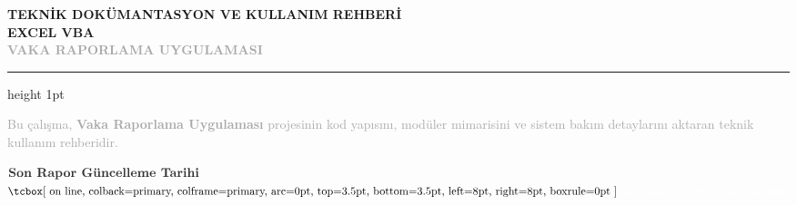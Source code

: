 \documentclass[11pt,a4paper,oneside]{report}
\begin{document}
\shorthandoff{=}

\begin{titlepage}
    \nopagecolor
    
    \vspace*{0.3cm}
    \begin{hfil}
    \begin{minipage}{0.85\textwidth}
        \linespread{1.2}\selectfont
        {\small\bfseries\textcolor{secondary}{TEKNİK DOKÜMANTASYON VE KULLANIM REHBERİ}} \\[0.3cm]
        {\Huge \bfseries \textcolor{primary}{EXCEL VBA}} \\[0.2cm]
        {\huge \bfseries \textcolor{darkgray}{VAKA RAPORLAMA UYGULAMASI}} \\[0.5cm]
        {\color{bordergray}\hrule height 1pt} 
        
        \vspace{2.5cm}
        
        \raggedright
        \small \textcolor{darkgray}{
           Bu çalışma, \textbf{Vaka Raporlama Uygulaması} projesinin kod yapısını, modüler mimarisini ve sistem bakım detaylarını aktaran teknik kullanım rehberidir.
        }
        
        \vspace{0.6cm}
        
        \begin{tcolorbox}[
            colback=lightgray,
            colframe=bordergray,
            leftrule=3.5pt,
            boxrule=0.4pt,
            top=6pt, bottom=6pt, left=10pt, right=10pt
        ]
            \small \centering
            $\vcenter{\hbox{\textcolor{primary}{\textbf{Son Rapor Güncelleme Tarihi}}}}$%
            \hspace{8pt}%
            $\vcenter{\hbox{%
                \tcbox[
                    on line,
                    colback=primary,
                    colframe=primary,
                    arc=0pt,
                    top=3.5pt, bottom=3.5pt, left=8pt, right=8pt,
                    boxrule=0pt
                ]{%
                    \small
                    \raisebox{-1pt}{\textcolor{white}{\faCalendarDay}}\hspace{5pt}%
                    \textcolor{white}{\bfseries \today}%
                }%
            }}$
        \end{tcolorbox}


\end{minipage}
\end{hfil}
\end{titlepage}
\end{document}
